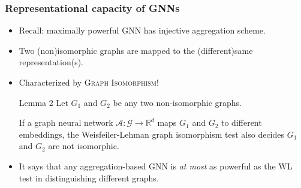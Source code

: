 \documentclass[handout]{beamer}
\begin{document}
\begin{frame}
\frametitle{Representational capacity of GNNs}

\begin{itemize}
	\item Recall: maximally powerful GNN has injective aggregation scheme. \pause
	
	\item Two (non)isomorphic graphs are mapped to the (different)same representation(s). \pause
	
	\item Characterized by \textsc{Graph Isomorphism}! \pause
	
	\begin{block}{Lemma 2}
Let $G_1$ and $G_2$ be any two non-isomorphic graphs.

If a graph neural network $\mathcal{A} : \mathcal{G} \rightarrow \mathbb{R}^d$ maps $G_1$ and $G_2$ to different embeddings, the Weisfeiler-Lehman graph isomorphism test also decides $G_1$ and $G_2$ are not isomorphic.
	\end{block} \pause

	\item It says that \alert{any aggregation-based GNN is {\it at most} as powerful as the WL test} in distinguishing different graphs.
\end{itemize}

\end{frame}
\end{document}
